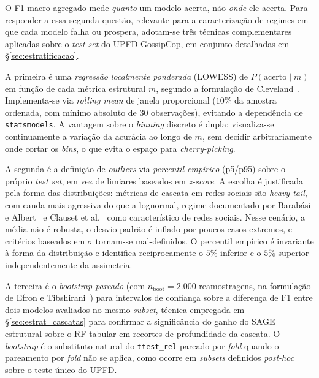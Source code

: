 O F1-macro agregado mede \emph{quanto} um modelo acerta, n\~ao \emph{onde}
ele acerta. Para responder a essa segunda quest\~ao, relevante para a
caracteriza\c{c}\~ao de regimes em que cada modelo falha ou prospera,
adotam-se tr\^es t\'ecnicas complementares aplicadas sobre o
\emph{test set} do UPFD-GossipCop, em conjunto detalhadas em
\S\ref{sec:estratificacao}.

A primeira \'e uma \emph{regress\~ao localmente ponderada} (LOWESS) de
$P(\text{acerto} \mid m)$ em fun\c{c}\~ao de cada m\'etrica estrutural $m$,
segundo a formula\c{c}\~ao de Cleveland~\cite{cleveland1979lowess}.
Implementa-se via \emph{rolling mean} de janela proporcional ($10\%$
da amostra ordenada, com m\'inimo absoluto de 30 observa\c{c}\~oes),
evitando a depend\^encia de \texttt{statsmodels}. A vantagem sobre o
\emph{binning} discreto \'e dupla: visualiza-se continuamente a varia\c{c}\~ao
da acur\'acia ao longo de $m$, sem decidir arbitrariamente onde cortar os
\emph{bins}, o que evita o espa\c{c}o para \emph{cherry-picking}.

A segunda \'e a defini\c{c}\~ao de \emph{outliers} via \emph{percentil
emp\'irico} (p5/p95) sobre o pr\'oprio \emph{test set}, em vez de
limiares baseados em \emph{z-score}. A escolha \'e justificada pela forma
das distribui\c{c}\~oes: m\'etricas de cascata em redes sociais s\~ao
\emph{heavy-tail}, com cauda mais agressiva do que a lognormal,
regime documentado por Barab\'asi e Albert~\cite{barabasi1999emergence}
e Clauset et al.~\cite{clauset2009powerlaw} como caracter\'istico de redes sociais. Nesse cen\'ario, a
m\'edia n\~ao \'e robusta, o desvio-padr\~ao \'e inflado por poucos
casos extremos, e crit\'erios baseados em $\sigma$ tornam-se
mal-definidos. O percentil emp\'irico \'e invariante \`a forma
da distribui\c{c}\~ao e identifica reciprocamente o $5\%$ inferior e o
$5\%$ superior independentemente da assimetria.

A terceira \'e o \emph{bootstrap pareado} (com $n_{\mathrm{boot}}=2.000$
reamostragens, na formula\c{c}\~ao de Efron e
Tibshirani~\cite{efron1993bootstrap}) para intervalos de confian\c{c}a
sobre a diferen\c{c}a de F1 entre dois modelos avaliados no mesmo
\emph{subset}, t\'ecnica empregada em \S\ref{sec:estrat_cascatas} para
confirmar a signific\^ancia do ganho do SAGE estrutural sobre o RF
tabular em recortes de profundidade da cascata. O \emph{bootstrap} \'e o substituto natural do
\texttt{ttest\_rel} pareado por \emph{fold} quando o pareamento por
\emph{fold} n\~ao se aplica, como ocorre em \emph{subsets} definidos
\emph{post-hoc} sobre o teste \'unico do UPFD.

